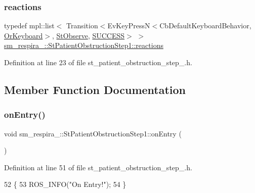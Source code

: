 \subsubsection{\texorpdfstring{reactions}{reactions}}
{\footnotesize\ttfamily typedef mpl\+::list$<$ Transition$<$Ev\+Key\+PressN$<$Cb\+Default\+Keyboard\+Behavior, \hyperlink{classsm__respira__1_1_1OrKeyboard}{Or\+Keyboard}$>$, \hyperlink{structsm__respira__1_1_1StObserve}{St\+Observe}, \hyperlink{classSUCCESS}{S\+U\+C\+C\+E\+SS}$>$ $>$ \hyperlink{structsm__respira__1_1_1StPatientObstructionStep1_a3dbf13d6ef34e327ff7fd96006be763e}{sm\+\_\+respira\+\_\+::\+St\+Patient\+Obstruction\+Step1\+::reactions}}



Definition at line 23 of file st\+\_\+patient\+\_\+obstruction\+\_\+step\+\_.\+h.



\subsection{Member Function Documentation}
\mbox{\label{structsm__respira__1_1_1StPatientObstructionStep1_abf880550f32fc9a0013f72862b08b585}} 
\subsubsection{\texorpdfstring{on\+Entry()}{onEntry()}}
{\footnotesize\ttfamily void sm\+\_\+respira\+\_\+::\+St\+Patient\+Obstruction\+Step1\+::on\+Entry (\begin{DoxyParamCaption}{ }\end{DoxyParamCaption})\hspace{0.3cm}{\ttfamily [inline]}}



Definition at line 51 of file st\+\_\+patient\+\_\+obstruction\+\_\+step\+\_.\+h.


\begin{DoxyCode}
52     \{
53         ROS\_INFO(\textcolor{stringliteral}{"On Entry!"});
54     \}
\end{DoxyCode}
\mbox{\label{structsm__respira__1_1_1StPatientObstructionStep1_a9db651db42809f269204c64762f3bad8}} 
